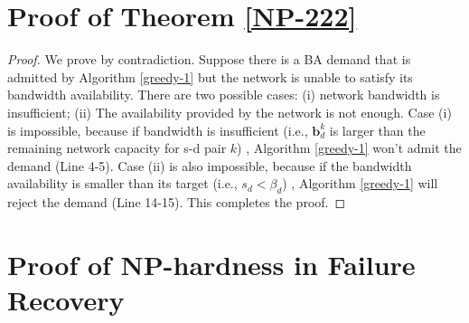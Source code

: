\documentclass[sigconf]{acmart}
\begin{document}
\begin{appendices}
\section{Proof of Theorem \ref{NP-222}} \label{appendix-proof}

\begin{proof}
We prove by contradiction. Suppose there is a BA demand that is admitted by Algorithm \ref{greedy-1} but the network is unable to satisfy its bandwidth availability.
There are two possible cases: (i) network bandwidth is insufficient; (ii) The availability provided by the network is not enough. 
Case (i) is impossible, because if bandwidth is insufficient (i.e., $\mathbf{b}^k_d$ is larger than the remaining network capacity for s-d pair $k$) , Algorithm \ref{greedy-1} won't admit the demand (Line 4-5).
Case (ii) is also impossible, because if the bandwidth availability is smaller than its target (i.e., $s_d <   \beta_{d}$) , Algorithm \ref{greedy-1} will reject the demand (Line 14-15).
This completes the proof. 
\end{proof}


\section{Proof of NP-hardness in Failure Recovery} \label{appendix1}


\end{appendices}
\end{document}
